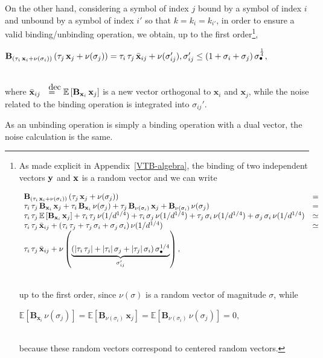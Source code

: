 \documentclass[sn-mathphys]{sn-jnl}
\newcommand{\eqline}[1]{~\vspace{0.1cm}\\\centerline{$#1$}\vspace{0.1cm}\\}
\begin{document}
\begin{appendices}
On the other hand, considering a symbol of index $j$ bound by a symbol of index $i$ and unbound by a symbol of index $i'$ so that $k = k_i = k_{i'}$, in order to ensure a valid binding/unbinding operation, we obtain, up to the first order\footnote{
As made explicit in Appendix~\ref{VTB-algebra}, the binding of two independent vectors ${\bf y}$ and ${\bf x}$ is a random vector and we can write
\eqline{\begin{array}{lc}
    \mathbf{B}_{(\tau_i \, \mathbf{x}_i + \nu(\sigma_i))} \, (\tau_j \, \mathbf{x}_j + \nu(\sigma_j)) &=\\
    \tau_i \, \tau_j \, \mathbf{B}_{\mathbf{x}_i} \, \mathbf{x}_j +
    \tau_i \, \mathbf{B}_{\mathbf{x}_i} \, \nu(\sigma_j) + 
    \tau_j \, \mathbf{B}_{\nu(\sigma_i)} \, \mathbf{x}_j +
    \mathbf{B}_{\nu(\sigma_i)} \, \nu(\sigma_j) &= \\
    \tau_i \, \tau_j \, \mathbb{E}\left[\mathbf{B}_{\mathbf{x}_i} \, \mathbf{x}_j\right] + 
    \tau_i \, \tau_j \, \nu(1/d^{1/4}) +
    \tau_i \, \sigma_j \, \nu(1/d^{1/4}) +
    \tau_j \, \sigma_i \, \nu(1/d^{1/4}) +
    \sigma_j \, \sigma_i \, \nu(1/d^{1/4}) &\simeq \\
    \tau_i \, \tau_j \, \bar{\bf x}_{ij} +
    (\tau_i \, \tau_j + \tau_j \, \sigma_i + \sigma_j \, \sigma_i) \, \nu(1/d^{1/4}) &\simeq \\
    \tau_i \, \tau_j \, \bar{\bf x}_{ij} +
    \nu\left(\underbrace{(\lvert \tau_i \, \tau_j \rvert +  \lvert \tau_i \rvert \, \sigma_j + \lvert \tau_j \rvert \, \sigma_i) \, \sigma_\bullet^{1/4}}_{\sigma_{ij}'}\right),
 \end{array}}
up to the first order, since $\nu(\sigma)$ is a random vector of magnitude $\sigma$, while
\eqline{\mathbb{E}\left[\mathbf{B}_{\mathbf{x}_i} \, \nu(\sigma_j)\right] = \mathbb{E}\left[\mathbf{B}_{\nu(\sigma_i)} \, \mathbf{x}_j\right] = \mathbb{E}\left[\mathbf{B}_{\nu(\sigma_i)} \, \nu(\sigma_j)\right] = 0,}
because these random vectors correspond to centered random vectors.},
\eqline{\mathbf{B}_{(\tau_i \, \mathbf{x}_i + \nu(\sigma_i))} \, (\tau_j \, \mathbf{x}_j + \nu(\sigma_j)) = \tau_i \, \tau_j \, \bar{\bf x}_{ij} + \nu(\sigma_{ij}'), \sigma_{ij}' \le (1 + \sigma_{i} + \sigma_j) \, \sigma_\bullet^{\frac{1}{4}},}
where $\bar{\bf x}_{ij} \deq \mathbb{E}\left[\mathbf{B}_{\mathbf{x}_i} \, \mathbf{x}_j\right]$ is a new vector orthogonal to $\mathbf{x}_i$ and $\mathbf{x}_j$, while the noise related to the binding operation is integrated into $\sigma_{ij}'$.

As an unbinding operation is simply a binding operation with a dual vector, the noise calculation is the same.


\end{appendices}
\end{document}
